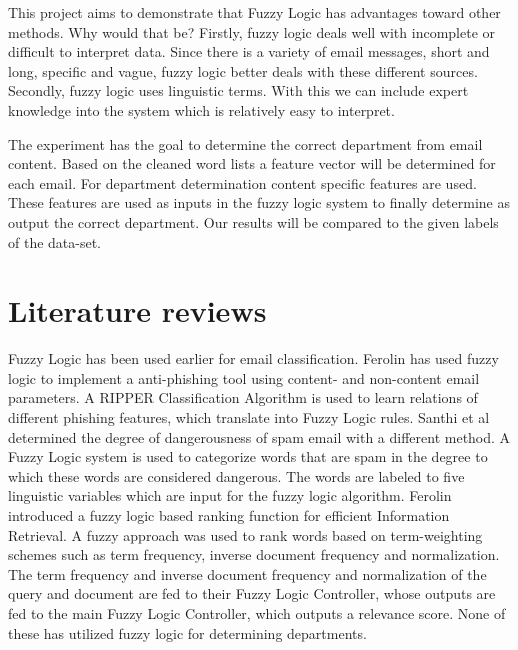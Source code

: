 \documentclass[journal]{IEEEtran}
\begin{document}
This project aims to demonstrate that Fuzzy Logic has advantages toward other methods. Why would that be? Firstly, fuzzy logic deals well with incomplete or difficult to interpret data. Since there is a variety of email messages, short and long, specific and vague, fuzzy logic better deals with these different sources. Secondly, fuzzy logic uses linguistic terms. With this we can include expert knowledge into the system which is relatively easy to interpret.


The experiment has the goal to determine the correct department from email content. Based on the cleaned word lists a feature vector will be determined for each email. For department determination content specific features are used. These features are used as inputs in the fuzzy logic system to finally determine as output the correct department. Our results will be compared to the given labels of the data-set.\\

\section{Literature reviews}

Fuzzy Logic has been used earlier for email classification. Ferolin \cite{phishing}
has used fuzzy logic to implement a anti-phishing tool using content- and non-content email parameters. A RIPPER Classification Algorithm is used to learn relations of different phishing features, which translate into Fuzzy Logic rules. Santhi et al \cite{spam} determined the degree of dangerousness of spam email with a different method. A Fuzzy Logic system is used to categorize words that are spam in the degree to which these words are considered dangerous. The words are labeled to five linguistic variables which are input for the fuzzy logic algorithm. Ferolin \cite{ranking} introduced a fuzzy logic based ranking function for efficient Information Retrieval. A fuzzy approach was used to rank words based on term-weighting schemes such as term frequency, inverse document frequency and normalization. The term frequency and inverse document frequency and normalization of the query and document are fed to their Fuzzy Logic Controller, whose outputs are fed to the main Fuzzy Logic Controller, which outputs a relevance score. None of these has utilized fuzzy logic for determining departments.
\end{document}

